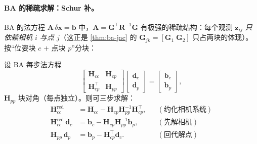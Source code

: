 \paragraph{BA 的稀疏求解：Schur 补。}
BA 的法方程 $\mathbf{A}\,\delta\mathbf{x}=\mathbf{b}$ 中，$\mathbf{A}=\mathbf{G}^\top\mathbf{R}^{-1}\mathbf{G}$ 有极强的稀疏结构\cite{barfoot2024state,carlone2026handbook}：每个观测 $\mathbf{z}_{ij}$ \emph{只依赖相机 $i$ 与点 $j$}（这正是 \cref{thm:ba-jac} 的 $\mathbf{G}_{jk}=[\mathbf{G}_1\;\mathbf{G}_2]$ 只占两块的体现）。按“位姿块 $c$ $+$ 点块 $p$”分块：

\begin{theorem}\label{thm:ba-schur}
设 BA 每步法方程
\begin{equation}
  \begin{bmatrix}\mathbf{H}_{cc}&\mathbf{H}_{cp}\\\mathbf{H}_{cp}^\top&\mathbf{H}_{pp}\end{bmatrix}
  \begin{bmatrix}\mathbf{d}_c\\\mathbf{d}_p\end{bmatrix}
  =\begin{bmatrix}\mathbf{b}_c\\\mathbf{b}_p\end{bmatrix},
  \label{eq:ba-normal}
\end{equation}
$\mathbf{H}_{pp}$ 块对角（每点独立）。则可三步求解：
\begin{align}
  \mathbf{H}_{cc}^{\text{red}}&=\mathbf{H}_{cc}-\mathbf{H}_{cp}\mathbf{H}_{pp}^{-1}\mathbf{H}_{cp}^\top,
  &&(\text{约化相机系统})\label{eq:schur-1}\\
  \mathbf{H}_{cc}^{\text{red}}\,\mathbf{d}_c&=\mathbf{b}_c-\mathbf{H}_{cp}\mathbf{H}_{pp}^{-1}\mathbf{b}_p,
  &&(\text{先解相机})\label{eq:schur-2}\\
  \mathbf{H}_{pp}\,\mathbf{d}_p&=\mathbf{b}_p-\mathbf{H}_{cp}^\top\mathbf{d}_c.
  &&(\text{回代解点})\label{eq:schur-3}
\end{align}
\end{theorem}
